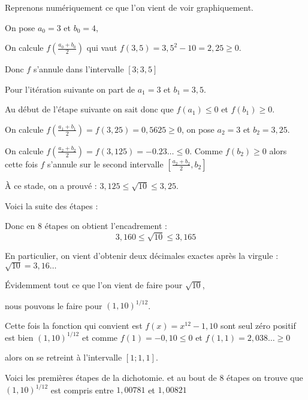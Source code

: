 
\diapo

Reprenons numériquement ce que l'on vient de voir graphiquement.

On pose $a_0=3$ et $b_0=4$,


On calcule $f(\frac{a_0+b_0}{2})$ qui vaut $f(3,5)=3,5^2-10 = 2,25 \ge0$. 

Donc $f$ s'annule dans l'intervalle $[3 ; 3,5]$ 



Pour l'itération suivante on part de $a_1 = 3$ et $b_1 = 3,5$.

\change


Au début de l'étape suivante on sait donc que $f(a_1) \le 0$ et $f(b_1) \ge0$. 

On calcule $f(\frac{a_1+b_1}{2})=f(3,25)=0,5625 \ge 0$, on pose $a_2=3$ et $b_2=3,25$.
  
\change

On calcule $f(\frac{a_2+b_2}{2})=f(3,125)=-0.23\ldots \le 0$.
  Comme $f(b_2) \ge 0$ alors cette fois $f$ s'annule sur le second intervalle 
  $[\frac{a_2+b_2}{2},b_2]$ 
  

\`A ce stade, on a prouvé : $3,125 \le \sqrt{10} \le 3,25$.


\diapo

  
Voici la suite des étapes :

Donc en $8$ étapes on obtient l'encadrement :
$$3,160  \le \sqrt{10} \le 3,165$$

En particulier, on vient d'obtenir deux décimales exactes après la virgule :
$\sqrt{10}=3,16\ldots$


\diapo

Évidemment tout ce que l'on vient de faire pour $\sqrt{10}$,

nous pouvons le faire pour $(1,10)^{1/12}$.

Cette fois la fonction qui convient est 
 $f(x) = x^{12} - 1,10$ sont seul zéro positif est bien $(1,10)^{1/12}$
 et comme $f(1)=-0,10 \le 0$ et $f(1,1)=2,038\ldots \ge 0$
 
 alors on se retreint à l'intervalle $[1; 1,1]$. 
 
Voici les premières étapes de la dichotomie.
et au bout de $8$ étapes on trouve que $(1,10)^{1/12}$ est compris entre 
$ 1,00781$ et $1,00821$

\diapo

